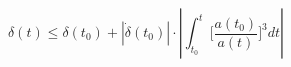 \begin{equation}\label{delta}
 \delta(t)\leq\delta(t_0)+|\dot{\delta}(t_0)|\cdot |\int_{t_0}^{t}\Big[\frac{a(t_0)}
 {a(t)}\Big]^3dt|
\end{equation}

